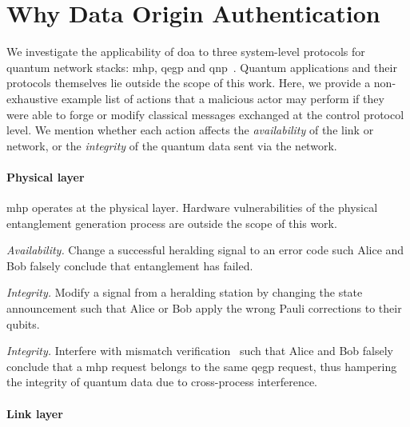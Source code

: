\section{Why Data Origin Authentication}
\label{sec:doa:why}

We investigate the applicability of \acrlong{doa} to three system-level protocols for quantum
network stacks: \acrshort{mhp}, \acrshort{qegp} and \acrshort{qnp}~\cite{dahlberg_2019_egp,
kozlowski_2020_qnp}. Quantum applications and their protocols themselves lie outside the scope of
this work. Here, we provide a non-exhaustive example list of actions that a malicious actor may
perform if they were able to forge or modify classical messages exchanged at the control protocol
level. We mention whether each action affects the \emph{availability} of the link or network, or the
\emph{integrity} of the quantum data sent via the network.

\paragraph{Physical layer}

\acrshort{mhp} operates at the physical layer. Hardware vulnerabilities of the physical entanglement
generation process are outside the scope of this work.

\begin{example}
\textit{Availability.}
Change a successful heralding signal to an error code such Alice and Bob falsely conclude that
entanglement has failed.
\end{example}

\begin{example}
\textit{Integrity.}
Modify a signal from a heralding station by changing the state announcement such that Alice or Bob
apply the wrong Pauli corrections to their qubits.
\end{example}

\begin{example}
\textit{Integrity.}
Interfere with mismatch verification~\cite{dahlberg_2019_egp, pompili_2022_experimental} such that
Alice and Bob falsely conclude that a \acrshort{mhp} request belongs to the same \acrshort{qegp}
request, thus hampering the integrity of quantum data due to cross-process interference.
\end{example}

\paragraph{Link layer}

